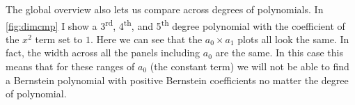 The global overview also lets us compare across degrees of polynomials.
In \autoref{fig:dimcmp} I show a 3\textsuperscript{rd}, 4\textsuperscript{th},
and 5\textsuperscript{th} degree polynomial with the coefficient of the $x^2$
term set to $1$. Here we can see that the $a_0 \times a_1$ plots all look the same.
In fact, the width across all the panels including $a_0$ are the same. In this
case this means that for these ranges of $a_0$ (the constant term) we will not
be able to find a Bernstein polynomial with positive Bernstein coefficients
no matter the degree of polynomial. 


